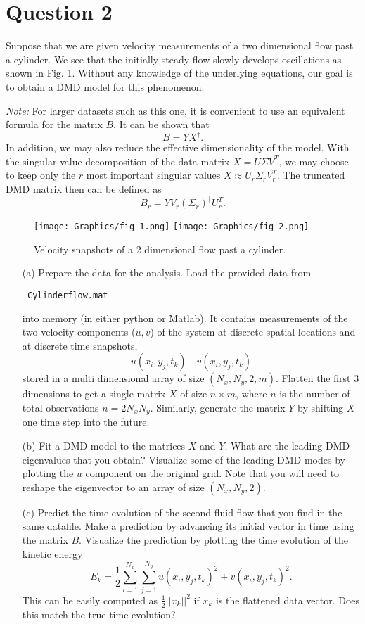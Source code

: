 \documentclass[twoside,10pt,a4paper]{article}
\begin{document}
\section*{Question 2}
Suppose that we are given velocity measurements of a two dimensional flow past a cylinder. We see that the initially steady flow slowly develops oscillations as shown in Fig. 1. Without any knowledge of the underlying equations, our goal is to obtain a DMD model for this phenomenon. 
\vspace{10pt}

{\em Note:} For larger datasets such as this one, it is convenient to use an equivalent formula for the matrix $B$. It can be shown that 
$$
B = YX^\dagger.
$$
In addition, we may also reduce the effective dimensionality of the model. With the singular value decomposition of the data matrix $X=U\Sigma V^T$, we may choose to keep only the $r$ most important singular values $X\approx U_r \Sigma_r V^T_r$. The truncated DMD matrix then can be defined as 
$$
B_r = YV_{r}(\Sigma_{r})^{\dagger}U_{r}^{T}.
$$

\begin{figure}[h!]
\label{fig1}
\texttt{[image: Graphics/fig\_1.png]}
\texttt{[image: Graphics/fig\_2.png]}
\caption{Velocity snapshots of a 2 dimensional flow past a cylinder.}
\end{figure}

\begin{enumerate}
\item[(a)] Prepare the data for the analysis. Load the provided data from \begin{verbatim} Cylinderflow.mat \end{verbatim}

 into memory (in either python or Matlab). It contains  measurements of the two velocity components ($u, v$) of the system at discrete spatial locations and at discrete time snapshots,
$$
u(x_i, y_j, t_k) \quad v(x_i, y_j, t_k) 
$$
 stored in a multi dimensional array of size $(N_x, N_y, 2, m)$. Flatten the first 3 dimensions to get a single matrix $X$ of size $n\times m$, where $n$ is the number of total observations $n = 2 N_x N_y $. Similarly, generate the matrix $Y$ by shifting $X$ one time step into the future. 
\item[(b)] Fit a DMD model to the matrices $X$ and $Y$. What are the leading DMD eigenvalues that you obtain? Visualize some of the leading DMD modes by plotting the $u$ component on the original grid. Note that you will need to reshape the eigenvector to an array of size $(N_x, N_y, 2)$. 
\item[(c)] Predict the time evolution of the second fluid flow that you find in the same datafile. Make a prediction by advancing its initial vector in time using the matrix $B$. Visualize the prediction by plotting the time evolution of the kinetic energy 
$$
E_k = \frac{1}{2} \sum_{i=1}^{N_x} \sum_{j=1}^{N_y} u(x_i, y_j, t_k)^2 +  v(x_i, y_j, t_k)^2.
$$
This can be easily computed as $\frac{1}{2}|| x_k ||^2$ if $x_k$ is the flattened data vector. Does this match the true time evolution?  
\end{enumerate}
\end{document}
